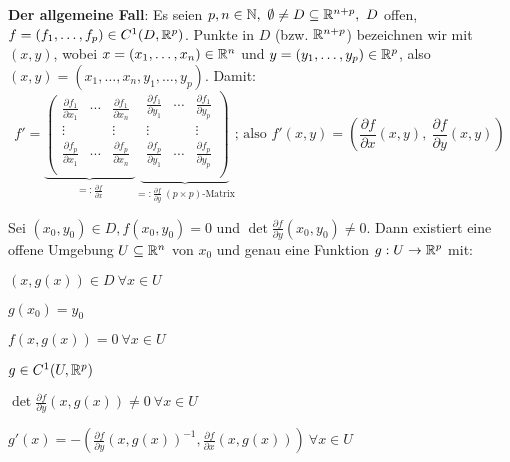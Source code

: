 \documentclass[a4paper,twoside,DIV15,BCOR12mm]{scrbook}
\begin{document}
\textbf{Der allgemeine Fall}:
Es seien $p,n\in\MdN,\ \emptyset\ne D\subseteq\MdR^{n+p},\ D$ offen, $f=(f_1,\ldots, f_p) \in C^1(D,\mathbb{R}^p)$. Punkte in $D$ (bzw. $\mathbb{R}^{n+p}$) bezeichnen wir mit $(x,y)$, wobei $x=(x_1,\ldots, x_n)\in\mathbb{R}^n$ und $y=(y_1,\ldots, y_p)\in\mathbb{R}^p$, also $(x,y)=(x_1,\dots,x_n,y_1,\ldots,y_p)$. Damit:
$$ f'=
\underbrace{
\left(
\begin{array}{ccc|}
\frac{\partial f_1}{\partial x_1} & \cdots & \frac{\partial f_1}{\partial x_n} \\
\vdots & & \vdots \\
\frac{\partial f_p}{\partial x_1} & \cdots & \frac{\partial f_p}{\partial x_n} \\
\end{array}
\right.
}_{=:\frac{\partial f}{\partial x}}
\underbrace{
\left.
\begin{array}{ccc}
\frac{\partial f_1}{\partial y_1} & \cdots & \frac{\partial f_1}{\partial y_p} \\
\vdots & & \vdots \\
\frac{\partial f_p}{\partial y_1} & \cdots & \frac{\partial f_p}{\partial y_p} \\
\end{array}
\right)
}_{=:\frac{\partial f}{\partial y}\ (p\times p)\text{-Matrix}}
\text{; also } f'(x,y)=\left(\frac{\partial f}{\partial x}(x,y),\ \frac{\partial f}{\partial y}(x,y)\right)$$

\begin{satz}
Sei $(x_0, y_0)\in D, f(x_0, y_0)=0$ und $\det\frac{\partial f}{\partial y}(x_0, y_0)\ne 0$. Dann existiert eine offene Umgebung $U\subseteq \mathbb{R}^n$ von $x_0$ und genau eine Funktion $g:U\to\mathbb{R}^p$ mit:
\begin{liste}
\item $(x, g(x))\in D\ \forall x\in U$
\item $g(x_0)=y_0$
\item $f(x,g(x))=0\ \forall x\in U$
\item $g \in C^1(U,\mathbb{R}^p)$
\item $\det\frac{\partial f}{\partial y}(x, g(x))\ne0\ \forall x\in U$
\item $g'(x)=-\left(\frac{\partial f}{\partial y}(x, g(x))^{-1},\frac{\partial f}{\partial x}(x, g(x))\right)\ \forall x\in U$
\end{liste}
\end{satz}
\end{document}
